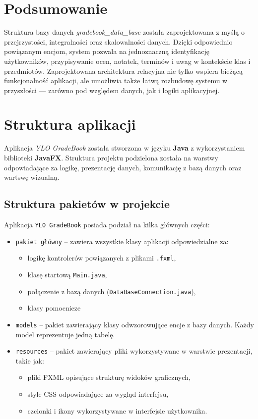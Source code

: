 \section*{Podsumowanie}

Struktura bazy danych \textit{gradebook\_data\_base} została zaprojektowana z myślą o przejrzystości, integralności oraz skalowalności danych. Dzięki odpowiednio powiązanym encjom, system pozwala na jednoznaczną identyfikację użytkowników, przypisywanie ocen, notatek, terminów i uwag w kontekście klas i przedmiotów. Zaprojektowana architektura relacyjna nie tylko wspiera bieżącą funkcjonalność aplikacji, ale umożliwia także łatwą rozbudowę systemu w przyszłości — zarówno pod względem danych, jak i logiki aplikacyjnej.

\newpage\newpage
\section{Struktura aplikacji}
\label{sec:strukturaAplikacji}

Aplikacja \textit{YLO GradeBook} została stworzona w języku \textbf{Java} z wykorzystaniem biblioteki \textbf{JavaFX}. Struktura projektu podzielona została na warstwy odpowiadające za logikę, prezentację danych, komunikację z bazą danych oraz wartswę wizualną.

\subsection{Struktura pakietów w projekcie}

Aplikacja \texttt{YLO GradeBook} posiada podział na kilka głównych części: 

\begin{itemize}
    \item \texttt{pakiet główny} – zawiera wszystkie klasy aplikacji odpowiedzialne za:
    \begin{itemize}
        \item logikę kontrolerów powiązanych z plikami \texttt{.fxml},
        \item klasę startową \texttt{Main.java},
        \item połączenie z bazą danych (\texttt{DataBaseConnection.java}),
        \item klasy pomocnicze
    \end{itemize}

    \item \texttt{models} – pakiet zawierający klasy odwzorowujące encje z bazy danych. Każdy model reprezentuje jedną tabelę.
    \item \texttt{resources} – pakiet zawierający pliki wykorzystywane w warstwie prezentacji, takie jak:
    \begin{itemize}
        \item pliki FXML opisujące strukturę widoków graficznych,
        \item style CSS odpowiadające za wygląd interfejsu,
        \item czcionki i ikony wykorzystywane w interfejsie użytkownika.
    \end{itemize}
\end{itemize}

